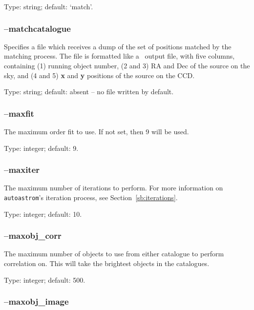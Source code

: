 \documentclass[twoside,11pt,nolof]{starlink}
\providecommand{\autoastrom}{\texttt{autoastrom}}
\providecommand{\SExtractor}{\xref{{\footnotesize SExtractor}}{sun226}{}}
\begin{document}
Type: string; default: `match'.

\subsubsection{--matchcatalogue\label{sb:options:matchcatalogue}}

Specifies a file which receives a dump of the set of positions matched by the
matching process.  The file is formatted like a \SExtractor\ output file, with
five columns, containing (1) running object number, (2 and 3) RA and Dec of
the source on the sky, and (4 and 5) \textbf{x} and \textbf{y} positions of
the source on the CCD.

Type: string; default: absent -- no file written by default.

\subsubsection{--maxfit\label{sb:options:maxfit}}

The maximum order fit to use. If not set, then 9 will be used.

Type: integer; default: 9.

\subsubsection{--maxiter\label{sb:options:maxiter}}

The maximum number of iterations to perform. For more information on
\autoastrom's iteration process, see Section~\ref{sb:iterations}.

Type: integer; default: 10.

\subsubsection{--maxobj\_corr\label{sb:options:maxobj_corr}}

The maximum number of objects to use from either catalogue to perform
correlation on. This will take the brightest objects in the catalogues.

Type: integer; default: 500.

\subsubsection{--maxobj\_image\label{sb:options:maxobj_image}}
\end{document}
